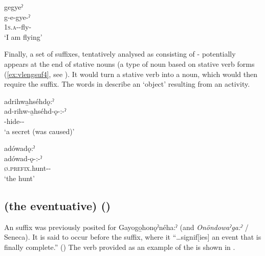 \ex gegyeˀ\\
\gll g-e-gye-ˀ\\
 \textsc{1s.a}-{\joinerE}-fly-{\stative}\\
\glt `I am flying'


\z
\z

Finally, a set of suffixes, tentatively analysed as consisting of  \textsc{\causative-\nsf} potentially appears at the end of stative nouns (a type of noun based on stative verb forms (\ref{ex:vlengsuf4}, see ). It would turn a stative verb into a noun, which would then require the  \textsc{\nsf} suffix. The words in  describe an ‘object’ resulting from an activity.

\ea\label{ex:vlengsuf4} 
\ea adrihwa̱hséhdǫ:ˀ\\
\gll ad-rihw-a̱hséhd-ǫ-:-ˀ\\
 -hide-\stat-\nominalizer{-\nsf}\\
\glt `a secret (was caused)'


\ex adówadǫ:ˀ\\
\gll adówad-ǫ-:-ˀ\\
 \textsc{ø.prefix}.hunt-\stat-\nominalizer{-\nsf}\\
\glt `the hunt'


\z
\z


\subsection{ (the eventuative) ({\eventuative})} \label{[-(h)sˀ] (the eventuative)}
An  \textsc{\eventuative} suffix was previously posited for Gayogo̱honǫˀnéha:ˀ (and \textit{Onöndowaˀga:ˀ} / Seneca). It is said to occur before the  \textsc{\stative} suffix, where it “…signif[ies] an event that is finally complete.” (\cite[283]{charles_history_2010}) The verb provided as an example of the  \textsc{\eventuative} is shown in .

